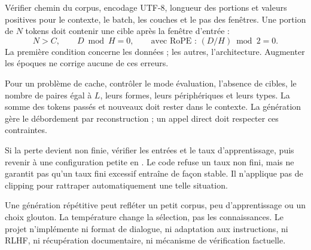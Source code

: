 Vérifier chemin du corpus, encodage UTF-8, longueur des portions et valeurs
positives pour le contexte, le batch, les couches et le pas des fenêtres.
Une portion de $N$ tokens doit contenir une cible après la fenêtre d'entrée :
\[
 N>C,\qquad D\bmod H=0,\qquad
 \text{avec RoPE : }(D/H)\bmod2=0.
\]
La première condition concerne les données ; les autres, l'architecture.
Augmenter les époques ne corrige aucune de ces erreurs.


Pour un problème de cache, contrôler le mode évaluation, l'absence de cibles,
le nombre de paires égal à $L$, leurs formes, leurs périphériques et leurs
types. La somme des tokens passés et nouveaux doit rester dans le contexte.
La génération gère le débordement par reconstruction ;
un appel direct doit respecter ces contraintes.

Si la perte devient non finie, vérifier les entrées et le taux d'apprentissage,
puis revenir à une configuration petite en . Le code refuse
un taux non fini, mais ne garantit pas qu'un taux fini excessif entraîne
de façon stable. Il n'applique pas de clipping pour rattraper automatiquement
une telle situation.

Une génération répétitive peut refléter un petit corpus, peu d'apprentissage
ou un choix glouton. La température change la sélection, pas les connaissances.
Le projet n'implémente ni format de dialogue,
ni adaptation aux instructions, ni RLHF, ni récupération documentaire,
ni mécanisme de vérification factuelle.



